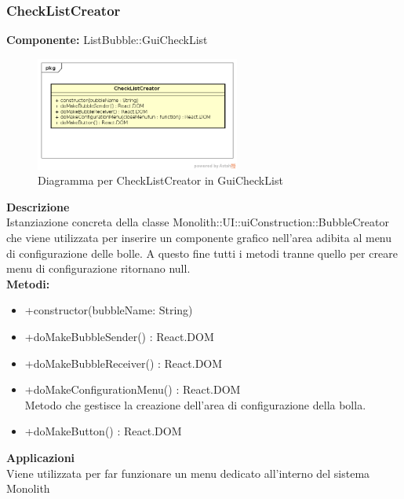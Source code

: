 \subsubsection{CheckListCreator}
\textbf{Componente:}  ListBubble::GuiCheckList\\
   \FloatBarrier
   \begin{figure}[ht]
   \centering
   \includegraphics[width=0.6\textwidth]{img/single-CheckListCreator.png}
   \caption{{Diagramma per CheckListCreator in GuiCheckList}}
\end{figure}
\FloatBarrier
\textbf{Descrizione}\\
Istanziazione concreta della classe Monolith::UI::uiConstruction::BubbleCreator che viene utilizzata per inserire un componente grafico nell'area adibita al menu di configurazione delle bolle. A questo fine tutti i metodi tranne quello per creare menu di configurazione ritornano null.
\\
\textbf{Metodi:} 
\begin{itemize}
\item +constructor(bubbleName: String)
\item +doMakeBubbleSender() : React.DOM 
\item +doMakeBubbleReceiver() : React.DOM  
\item +doMakeConfigurationMenu() : React.DOM  
\\
Metodo che gestisce la creazione dell'area di configurazione della bolla.
\item +doMakeButton() : React.DOM  
\end{itemize} 


\textbf{Applicazioni}\\
Viene utilizzata per far funzionare un menu dedicato all'interno del sistema Monolith 


\clearpage

